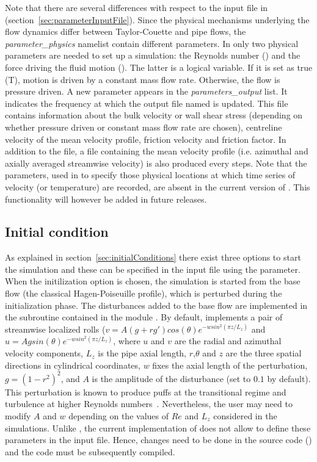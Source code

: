 \documentclass[a4paper, 11pt, DIV=11]{scrartcl}
\begin{document}
Note that there are several differences with respect to the input file  in \nsc
(section~\ref{sec:parameterInputFile}). Since the physical mechanisms underlying
the flow dynamics differ between Taylor-Couette and pipe flows, the
\emph{parameter\_physics} namelist contain different parameters. In \nsp only two
physical parameters are needed to set up a simulation: the Reynolds number () and
the force driving the fluid motion (). The latter is a logical variable.
If it is set as true (T), motion is driven by a constant mass flow rate. Otherwise,
the flow is pressure driven. A new parameter  appears in the
\emph{parameters\_output} list. It indicates the frequency at which the output file named
 is updated. This file contains information about the bulk velocity or wall shear
stress (depending on whether pressure driven or constant mass flow rate are chosen), centreline
velocity of the mean velocity profile, friction velocity and friction factor. In addition to
the  file, a file containing the mean velocity profile (i.e. azimuthal and axially
averaged streamwise velocity) is also produced every  steps. Note that the
 parameters,  used in \nsc to specify those physical locations at which time
series of velocity (or temperature) are recorded, are absent in the current version of \nsp.
This functionality will however be added in future releases. 


\subsection{Initial condition}
\label{subsec:initial_condition_pipe}

As explained in section~\ref{sec:initialConditions} there exist three options to start
the simulation and these can be specified in the input file using the  parameter.
When the initilization option  is chosen, the simulation is started from
the base flow (the classical Hagen-Poiseuille profile), which is perturbed during the
initialization phase. The disturbances added to the base flow are implemented in the subroutine
 contained in the module . By default,
\nsp implements a pair of streamwise localized rolls ($v=A(g+rg') cos(\theta) e^{-wsin^2(\pi z/L_z)}$ and
$u=A g sin(\theta) e^{-wsin^2(\pi z/L_z)}$, where $u$ and $v$ are the
radial and azimuthal velocity components, $L_z$ is the pipe axial length,
$r$,$\theta$ and $z$ are the three spatial directions in cylindrical
coordinates, $w$ fixes the axial length of the perturbation,
$g=(1-r^2)^2$,  and $A$ is the amplitude of the
disturbance (set to $0.1$ by default). This perturbation is known to produce puffs at the
transitional regime and turbulence at higher Reynolds numbers~\cite{Mellibovsky2009}.
Nevertheless, the user may need to modify $A$ and $w$
depending on the values of $Re$ and $L_z$ considered in the simulations.
Unlike \nsc, the current implementation of \nsp does not allow
to define these parameters in the input file. Hence, changes need
to be done in the source code () and the
code must be subsequently compiled. 
\end{document}
